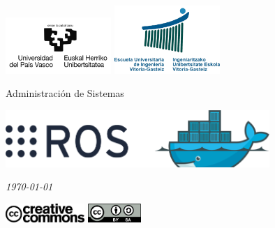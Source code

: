 \begin{titlepage}
	\includegraphics[width=0.3\textwidth]{figuras/logoEHU}
	\hspace{\fill}
	\includegraphics[width=0.3\textwidth]{figuras/logoEUI}
	\vspace{1.5cm}
	\begin{center}
		
		\LARGE{Administración de Sistemas}
		
		\vskip1.5cm
		
		\Huge{\textbf{\thetitle}}
		
		\vskip1.5cm
		
		\includegraphics[width=10cm]{figuras/docker-ros-logo}
		
		\vskip1.5cm
		
		\Large{\theauthor}
	
		\vskip 1cm
		
		\textit{\today}
	\end{center}
	\vspace{2cm}
	\hspace{\fill}
	\includegraphics[width=3cm]{figuras/cclogolarge}
	\hspace{1cm}
	\includegraphics[width=2cm]{figuras/by-sa}
	\hspace{\fill}
\end{titlepage}
